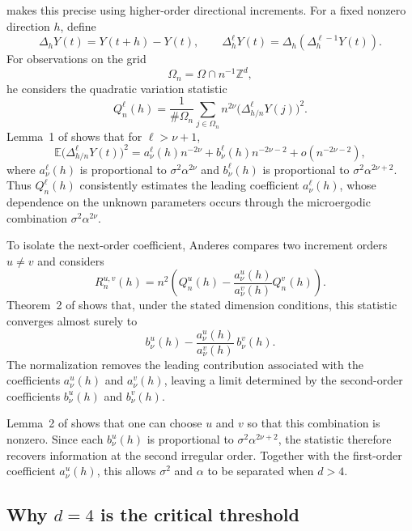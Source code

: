 \documentclass[11pt, reqno]{amsart}
\theoremstyle{remark}
\newcommand{\E}{\mathbb{E}}
\newcommand{\1}{\mathbf{1}}
\begin{document}
\citet{Anderes2010} makes this precise using higher-order directional
increments. For a fixed nonzero direction \(h\), define
\[
\Delta_h Y(t)=Y(t+h)-Y(t),
\qquad
\Delta_h^\ell Y(t)=\Delta_h(\Delta_h^{\ell-1}Y(t)).
\]
For observations on the grid
\[
\Omega_n=\Omega\cap n^{-1}\mathbb Z^d,
\]
he considers the quadratic variation statistic
\[
Q_n^\ell(h)
=
\frac{1}{\#\Omega_n}\sum_{j\in\Omega_n}
n^{2\nu}\bigl(\Delta_{h/n}^\ell Y(j)\bigr)^2 .
\]
Lemma~1 of \citet{Anderes2010} shows that for \(\ell>\nu+1\),
\[
\E\bigl(\Delta_{h/n}^\ell Y(t)\bigr)^2
=
a_\nu^\ell(h)n^{-2\nu}
+
b_\nu^\ell(h)n^{-2\nu-2}
+
o(n^{-2\nu-2}),
\]
where \(a_\nu^\ell(h)\) is proportional to \(\sigma^2\alpha^{2\nu}\) and
\(b_\nu^\ell(h)\) is proportional to \(\sigma^2\alpha^{2\nu+2}\).
Thus \(Q_n^\ell(h)\) consistently estimates the leading coefficient
\(a_\nu^\ell(h)\), whose dependence on the unknown parameters occurs
through the microergodic combination \(\sigma^2\alpha^{2\nu}\).

To isolate the next-order coefficient, Anderes compares two increment
orders \(u\neq v\) and considers
\[
R_n^{u,v}(h)
=
n^2\!\left(
Q_n^u(h)
-
\frac{a_\nu^u(h)}{a_\nu^v(h)}Q_n^v(h)
\right).
\]
Theorem~2 of \citet{Anderes2010} shows that, under the stated dimension
conditions, this statistic converges almost surely to
\[
b_\nu^u(h)-\frac{a_\nu^u(h)}{a_\nu^v(h)}\,b_\nu^v(h).
\]
The normalization removes the leading contribution associated with the
coefficients \(a_\nu^u(h)\) and \(a_\nu^v(h)\), leaving a limit determined
by the second-order coefficients \(b_\nu^u(h)\) and \(b_\nu^v(h)\).

Lemma~2 of \citet{Anderes2010} shows that one can choose \(u\) and \(v\)
so that this combination is nonzero.
Since each \(b_\nu^u(h)\) is proportional to \(\sigma^2\alpha^{2\nu+2}\),
the statistic therefore recovers information at the second irregular
order.
Together with the first-order coefficient \(a_\nu^u(h)\), this allows
\(\sigma^2\) and \(\alpha\) to be separated when \(d>4\).

\subsection{Why \(d=4\) is the critical threshold}
\end{document}
